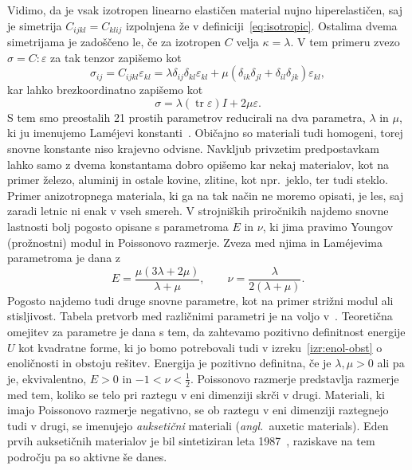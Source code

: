 \documentclass[12pt,a4paper,twoside]{article}
\theoremstyle{definition} %
\theoremstyle{plain} %
\numberwithin{equation}{section}
\newcommand{\eps}{\varepsilon}
\newcommand{\ts}{\sigma}
\DeclareMathOperator{\tr}{tr}
\newcommand{\ang}[1]{(\hspace{-1.5px}\textit{angl.}\ #1)}
\begin{document}
Vidimo, da je vsak izotropen linearno elastičen material nujno hiperelastičen, saj je simetrija
$C_{ijkl} = C_{klij}$ izpolnjena že v definiciji~\eqref{eq:isotropic}. Ostalima dvema simetrijama
je zadoščeno le, če za izotropen $C$ velja $\kappa = \lambda$.
V tem primeru zvezo $\ts = C:\eps$ za tak tenzor zapišemo kot
\begin{equation}
  \sigma_{ij} = C_{ijkl}\eps_{kl} = \lambda \delta_{ij}\delta_{kl} \eps_{kl} +
  \mu(\delta_{ik}\delta_{jl} + \delta_{il}\delta_{jk})\eps_{kl},
\end{equation}
kar lahko brezkoordinatno zapišemo kot
\begin{equation}
  \ts = \lambda (\tr\eps)I + 2\mu \eps.
  \label{eq:hooke-isotropic}
\end{equation}
S tem smo preostalih 21 prostih parametrov reducirali na dva parametra, $\lambda$ in $\mu$, ki ju
imenujemo Lam\'{e}jevi konstanti~\cite[str.\ 211]{slaughter2012linearized}. Običajno so materiali
tudi homogeni, torej snovne konstante niso krajevno odvisne. Navkljub privzetim predpostavkam lahko
samo z dvema konstantama dobro opišemo kar nekaj materialov, kot na primer železo, aluminij in ostale
kovine, zlitine, kot npr.~jeklo, ter tudi steklo. Primer anizotropnega materiala, ki ga na tak način
ne moremo opisati, je les, saj zaradi letnic ni enak v vseh smereh. V strojniških priročnikih
najdemo snovne lastnosti bolj pogosto opisane s parametroma $E$ in $\nu$, ki jima pravimo Youngov
(prožnostni) modul in Poissonovo razmerje. Zveza med njima in Lam\'{e}jevima parametroma je dana z
\begin{equation}
   E = \frac{\mu(3\lambda+2\mu)}{\lambda+\mu}, \qquad \nu = \frac{\lambda}{2(\lambda+\mu)}.
\end{equation}
Pogosto najdemo tudi druge snovne parametre, kot na primer strižni modul ali stisljivost. Tabela
pretvorb med različnimi parametri je na voljo v~\cite[tabela 5.1,
str.~215]{slaughter2012linearized}. Teoretična omejitev za parametre je dana s tem, da zahtevamo
pozitivno definitnost energije $U$ kot kvadratne forme, ki jo bomo potrebovali tudi v
izreku~\ref{izr:enol-obst} o enoličnosti in obstoju rešitev. Energija je pozitivno definitna,
če je $\lambda, \mu > 0$ ali pa je, ekvivalentno, $E > 0$ in $-1 < \nu < \frac12$.
Poissonovo razmerje predstavlja razmerje med tem, koliko se telo pri raztegu v eni dimenziji
skrči v drugi. Materiali, ki imajo Poissonovo razmerje negativno, se ob raztegu v eni dimenziji
raztegnejo tudi v drugi, se imenujejo \emph{auksetični} materiali \ang{auxetic materials}.
Eden prvih auksetičnih materialov je bil sintetiziran leta 1987~\cite{lakes1987foam}, raziskave na
tem področju pa so aktivne še danes.
\end{document}
